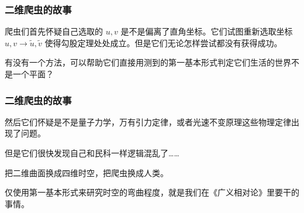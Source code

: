 \documentclass[CJK,13pt]{beamer}
\begin{document}
\begin{frame}
  \frametitle{二维爬虫的故事}  

  \bitem
\item{爬虫们首先怀疑自己选取的 $u, v$ 是不是偏离了直角坐标。它们试图重新选取坐标 $u, v \rightarrow \tilde{u},\tilde{v}$ 使得勾股定理处处成立。但是它们无论怎样尝试都没有获得成功。}
  \eitem

  \skiplines
  
  有没有一个方法，可以帮助它们直接用测到的第一基本形式判定它们生活的世界不是一个平面？
\end{frame}

\begin{frame}
  \frametitle{二维爬虫的故事}
  \bitem
\item{然后它们怀疑是不是量子力学，万有引力定律，或者光速不变原理这些物理定律出现了问题。}
  \eitem


但是它们很快发现自己和民科一样逻辑混乱了……
\end{frame}


\begin{frame}
  把二维曲面换成四维时空，把爬虫换成人类。

  \skiplines
  
  {\blue 仅使用第一基本形式来研究时空的弯曲程度，就是我们在《广义相对论》里要干的事情。}

\end{frame}


\ech
\end{document}
